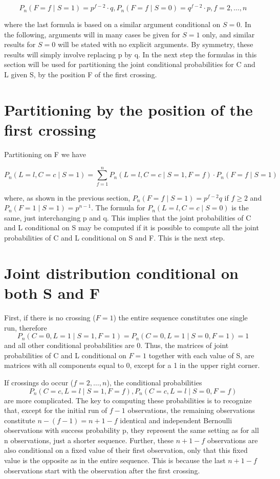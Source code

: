 $$P_n (F=f \mid S=1) = p^{f-2} \cdot q, P_n (F=f \mid S=0) =q^{f-2} \cdot p, f=2, \ldots ,n$$

where the last formula is based on a similar argument conditional on $S = 0$. In the following, arguments will in many cases be given for $S = 1$ only, and similar results for $S = 0$ will be stated with no explicit arguments. By symmetry, these results will simply involve replacing p by q. In the next step the formulas in this section will be used for partitioning the joint conditional probabilities for C and L given S, by the position F of the first crossing. 

\section{Partitioning by the position of the first crossing}

Partitioning on  F we have

$$P_n (L=l,C=c \mid S=1) = \sum_{f=1}^n P_n(L=l,C=c \mid S=1,F=f) \cdot P_n (F=f \mid S=1)$$

where, as shown in the previous section, $P_n (F=f \mid S=1) =p^{f-2}q$ if $f \geq 2$ and $P_n (F=1 \mid S=1) = p^{n-1}$. The formula for $P_n (L=l,C=c \mid S=0)$ is the same, just interchanging p and q. This implies that the joint probabilities of C and L conditional on S may be computed if it is possible to compute all the joint probabilities of C and L conditional on S and F. This is the next step.

\section{Joint distribution conditional on both S and F}

First, if there is no crossing ($F=1$) the entire sequence constitutes one single run, therefore $$P_n (C=0,L=1 \mid S=1,F=1)=P_n (C=0,L=1 \mid S=0,F=1)=1$$ and all other conditional probabilities are 0. Thus, the matrices of joint probabilities of C and L conditional on $F=1$ together with each value of S, are matrices with all components equal to 0, except for a 1 in the upper right corner.

If crossings do occur ($f=2, \ldots ,n$), the conditional probabilities $$P_n (C=c,L=l \mid S=1,F=f), P_n (C=c,L=l \mid S=0,F=f)$$ are more complicated. The key to computing these probabilities is to recognize that, except for the initial run of $f-1$ observations, the remaining observations constitute $n-(f-1)=n+1-f$ identical and independent Bernoulli observations with success probability p, they represent the same setting as for all n observations, just a shorter sequence. Further, these $n+1-f$ observations are also conditional on a fixed value of their first observation, only that this fixed value is the opposite as in the entire sequence. This is because the last $n+1-f$ observations start with the  observation after the first crossing. 

